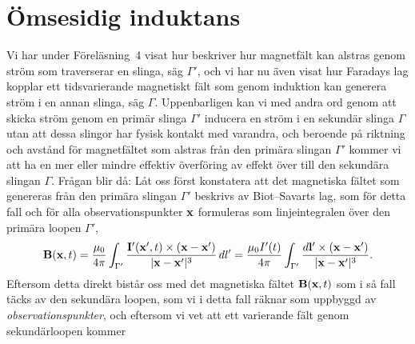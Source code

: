\section{{\"O}msesidig induktans}
Vi har under F{\"o}rel{\"a}sning~4 visat hur  beskriver
hur magnetf{\"a}lt kan alstras genom str{\"o}m som traverserar en slinga,
s{\"a}g $\Gamma'$, och vi har nu {\"a}ven visat hur Faradays lag kopplar ett
tidsvarierande magnetiskt f{\"a}lt som genom induktion kan generera str{\"o}m
i en annan slinga, s{\"a}g $\Gamma$.
Uppenbarligen kan vi med andra ord genom att skicka str{\"o}m genom en
prim{\"a}r slinga $\Gamma'$ inducera en str{\"o}m i en sekund{\"a}r slinga
$\Gamma$ utan att dessa slingor har fysisk kontakt med varandra, och beroende
p{\aa} riktning och avst{\aa}nd f{\"o}r magnetf{\"a}ltet som alstras fr{\aa}n
den prim{\"a}ra slingan $\Gamma'$ kommer vi att ha en mer eller mindre effektiv
{\"o}verf{\"o}ring av effekt {\"o}ver till den sekund{\"a}ra slingan $\Gamma$.
\noindent
Fr{\aa}gan blir d{\aa}:
\noindent
L{\aa}t oss f{\"o}rst konstatera att det magnetiska f{\"a}ltet som genereras
fr{\aa}n den prim{\"a}ra slingan
$\Gamma'$ beskrivs av Biot--Savarts lag, som f{\"o}r detta fall och f{\"o}r
alla observationspunkter ${\bf x}$ formuleras som
linjeintegralen
{\"o}ver den prim{\"a}ra loopen $\Gamma'$,
$$
  {\bf B}({\bf x},t)={{\mu_0}\over{4\pi}}\int_{\Gamma'}
    {{{\bf I}'({\bf x}',t)\times({\bf x}-{\bf x}')}
      \over{|{\bf x}-{\bf x}'|^3}}\,dl'
    ={{\mu_0 I'(t)}\over{4\pi}}\int_{\Gamma'}
      {{d{\bf l}'\times({\bf x}-{\bf x}')}\over{|{\bf x}-{\bf x}'|^3}}.
$$
Eftersom detta direkt bist{\aa}r oss med det magnetiska f{\"a}ltet
${\bf B}({\bf x},t)$ som i s{\aa} fall t{\"a}cks av den sekund{\"a}ra loopen,
som vi i detta fall r{\"a}knar som uppbyggd av {\it observationspunkter}, och
eftersom vi vet att ett varierande f{\"a}lt genom sekund{\"a}rloopen kommer
